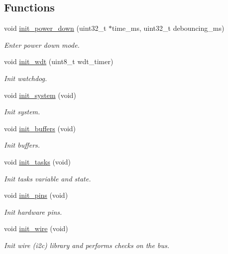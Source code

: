 \subsection*{Functions}
\begin{DoxyCompactItemize}
\item 
void \hyperlink{i2c-th_8h_afb98a0f07c30784284f48271ffe02b97}{init\+\_\+power\+\_\+down} (uint32\+\_\+t $\ast$time\+\_\+ms, uint32\+\_\+t debouncing\+\_\+ms)
\begin{DoxyCompactList}\small\item\em Enter power down mode. \end{DoxyCompactList}\item 
void \hyperlink{i2c-th_8h_a980e73df66b14b1190bc25da430a4f12}{init\+\_\+wdt} (uint8\+\_\+t wdt\+\_\+timer)
\begin{DoxyCompactList}\small\item\em Init watchdog. \end{DoxyCompactList}\item 
void \hyperlink{i2c-th_8h_a348d23d5899ce59d18975284dfb0afc0}{init\+\_\+system} (void)
\begin{DoxyCompactList}\small\item\em Init system. \end{DoxyCompactList}\item 
void \hyperlink{i2c-th_8h_ad438327c9cf783bd9c519ce8b8ef3bfa}{init\+\_\+buffers} (void)
\begin{DoxyCompactList}\small\item\em Init buffers. \end{DoxyCompactList}\item 
void \hyperlink{i2c-th_8h_a2aae2290a141fddcea3fb6009acbb445}{init\+\_\+tasks} (void)
\begin{DoxyCompactList}\small\item\em Init tasks variable and state. \end{DoxyCompactList}\item 
void \hyperlink{i2c-th_8h_aa9c113540346b54d49b2a596e6ba8480}{init\+\_\+pins} (void)
\begin{DoxyCompactList}\small\item\em Init hardware pins. \end{DoxyCompactList}\item 
void \hyperlink{i2c-th_8h_a7c21452937863fa02a29654247eef09b}{init\+\_\+wire} (void)
\begin{DoxyCompactList}\small\item\em Init wire (i2c) library and performs checks on the bus. \end{DoxyCompactList}\item 

\end{DoxyCompactItemize}
